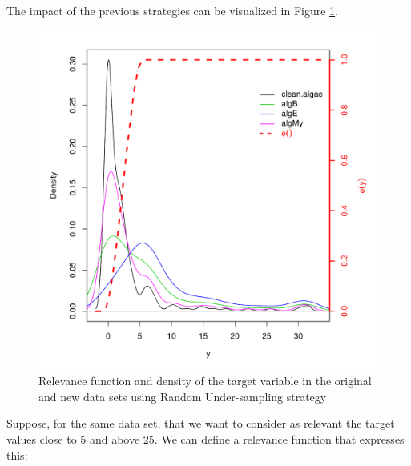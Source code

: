 \documentclass[10pt,a4paper]{article}\usepackage[]{graphicx}\usepackage[]{color}
\makeatletter
\def\maxwidth{ %
  \ifdim\Gin@nat@width>\linewidth
    \linewidth
  \else
    \Gin@nat@width
  \fi
}
\newenvironment{knitrout}{}{} %
\makeatother
\begin{document}
The impact of the previous strategies can be visualized in Figure \ref{fig:RU_ex1}.
\begin{knitrout}\footnotesize
{}\color{fgcolor}\begin{figure}

{\centering \includegraphics[width=\maxwidth]{figures/UBL-RU_ex1-1} 

}

\caption[Relevance function and density of the target variable in the original and new data sets using Random Under-sampling strategy]{Relevance function and density of the target variable in the original and new data sets using Random Under-sampling strategy}\label{fig:RU_ex1}
\end{figure}


\end{knitrout}


Suppose, for the same data set, that we want to consider as relevant the target values close to 5 and above 25. We can define a relevance function that expresses this:
\end{document}
